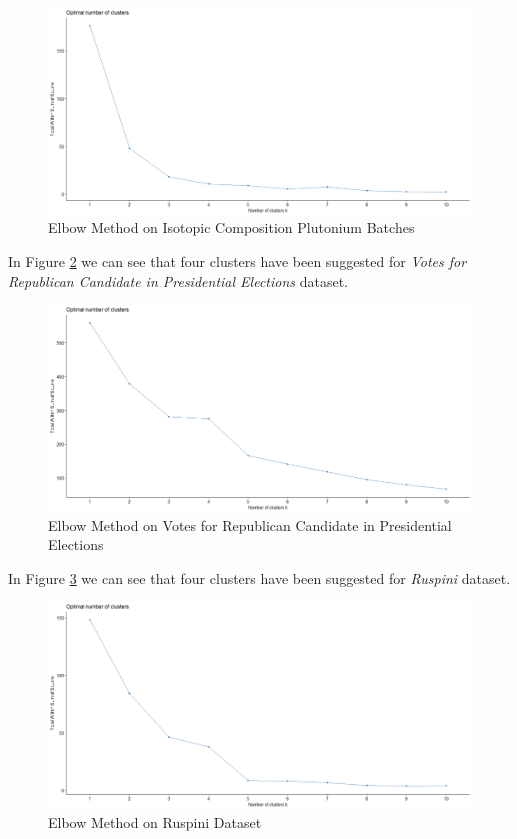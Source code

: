 \begin{itemize}
\begin{figure}[h!]
  \centering
  \includegraphics[scale=1.3]{figures/results/pluton/elbow.png}
  \caption{Elbow Method on Isotopic Composition Plutonium Batches}
  \label{fig:elbow2}
\end{figure}

\vspace{15mm}

In Figure \ref{fig:elbow3} we can see that four clusters have been suggested for \textit{Votes for Republican Candidate in Presidential Elections}
dataset.

\begin{figure}[h!]
  \centering
  \includegraphics[scale=1.3]{figures/results/republican/elbow.png}
  \caption{Elbow Method on Votes for Republican Candidate in Presidential Elections}
  \label{fig:elbow3}
\end{figure}

\newpage

In Figure \ref{fig:elbow4} we can see that four clusters have been suggested for \textit{Ruspini} dataset.

\begin{figure}[h!]
  \centering
  \includegraphics[scale=1.3]{figures/results/ruspini/elbow.png}
  \caption{Elbow Method on Ruspini Dataset}
  \label{fig:elbow4}
\end{figure}


\end{itemize}
